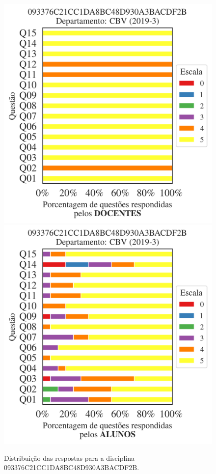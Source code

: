 \documentclass[a4paper,10pt]{article}
\begin{document}
\begin{figure}[h]
\centering
\includegraphics[width=0.485\linewidth]{analise_disciplina_departamento_CBV_093376C21CC1DA8BC48D930A3BACDF2B_docentes.png}
\includegraphics[width=0.485\linewidth]{analise_disciplina_departamento_CBV_093376C21CC1DA8BC48D930A3BACDF2B_alunos.png}
\caption{\label{fig:analise_geral_departamento}                Distribuição das respostas para a disciplina 093376C21CC1DA8BC48D930A3BACDF2B. }
\end{figure}
\end{document}
